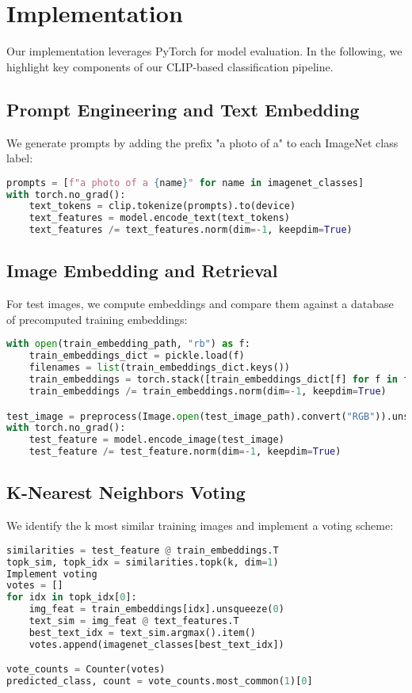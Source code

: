 \documentclass[9pt,a4paper,twocolumn,twoside]{tau-class/tau}
\begin{document}
\section{Implementation}
Our implementation leverages PyTorch for model evaluation. In the following, we highlight key components of our CLIP-based classification pipeline.

\subsection{Prompt Engineering and Text Embedding}

We generate prompts by adding the prefix "a photo of a" to each ImageNet class label:

\begin{lstlisting}[language=Python]
prompts = [f"a photo of a {name}" for name in imagenet_classes]
with torch.no_grad():
    text_tokens = clip.tokenize(prompts).to(device)
    text_features = model.encode_text(text_tokens)
    text_features /= text_features.norm(dim=-1, keepdim=True)
\end{lstlisting}
\subsection{Image Embedding and Retrieval}

For test images, we compute embeddings and compare them against a database of precomputed training embeddings:

\begin{lstlisting}[language=Python]
with open(train_embedding_path, "rb") as f:
    train_embeddings_dict = pickle.load(f)
    filenames = list(train_embeddings_dict.keys())
    train_embeddings = torch.stack([train_embeddings_dict[f] for f in filenames]).to(device)
    train_embeddings /= train_embeddings.norm(dim=-1, keepdim=True)

test_image = preprocess(Image.open(test_image_path).convert("RGB")).unsqueeze(0).to(device)
with torch.no_grad():
    test_feature = model.encode_image(test_image)
    test_feature /= test_feature.norm(dim=-1, keepdim=True)
\end{lstlisting}
\subsection{K-Nearest Neighbors Voting}

We identify the k most similar training images and implement a voting scheme:

\begin{lstlisting}[language=Python]
similarities = test_feature @ train_embeddings.T
topk_sim, topk_idx = similarities.topk(k, dim=1)
Implement voting
votes = []
for idx in topk_idx[0]:
    img_feat = train_embeddings[idx].unsqueeze(0)
    text_sim = img_feat @ text_features.T
    best_text_idx = text_sim.argmax().item()
    votes.append(imagenet_classes[best_text_idx])

vote_counts = Counter(votes)
predicted_class, count = vote_counts.most_common(1)[0]
\end{lstlisting}
\end{document}
